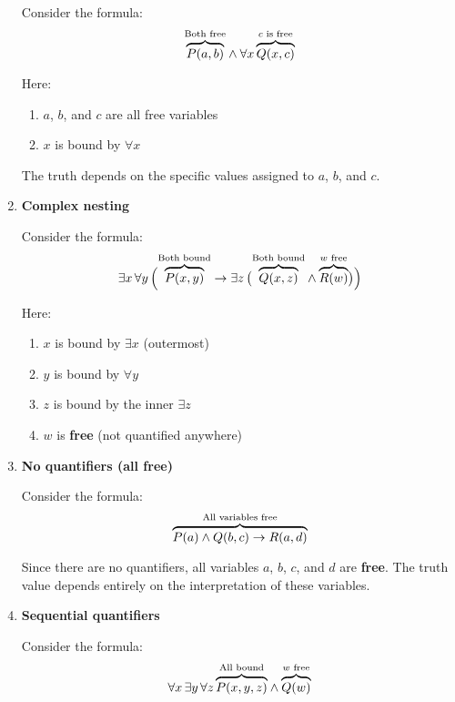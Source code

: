 \documentclass[12pt,a4paper,openany]{article}
\begin{document}
\begin{enumerate}
    Consider the formula:
    \[
    {\color{black}\overbrace{\color{black}P(a, b)}^{\color{black}\text{Both free}}} \wedge
    \forall x \,
    {\color{black}\overbrace{\color{black}Q(x, c)}^{\color{black}c \text{ is free}}}
    \]

    Here:
    \begin{enumerate}
        \item $a$, $b$, and $c$ are all free variables
        \item $x$ is bound by $\forall x$
    \end{enumerate}
    The truth depends on the specific values assigned to $a$, $b$, and $c$.
\item
    \textbf{Complex nesting}

    Consider the formula:
    \[
    \exists x \, \forall y \, \Big(
    {\color{black}\overbrace{\color{black}P(x, y)}^{\color{black}\text{Both bound}}} \rightarrow
    \exists z \,
    \big(
    {\color{black}\overbrace{\color{black}Q(x, z)}^{\color{black}\text{Both bound}}} \wedge
    {\color{black}\overbrace{\color{black}R(w)}^{\color{black}w \text{ free}}}
    \big)
    \Big)
    \]

    Here:
    \begin{enumerate}
        \item $x$ is bound by $\exists x$ (outermost)
        \item $y$ is bound by $\forall y$
        \item $z$ is bound by the inner $\exists z$
        \item $w$ is \textbf{free} (not quantified anywhere)
    \end{enumerate}
\item
    \textbf{No quantifiers (all free)}

    Consider the formula:
    \[
    {\color{black}\overbrace{\color{black}P(a) \wedge Q(b, c) \rightarrow R(a, d)}^{\color{black}\text{All variables free}}}
    \]

    Since there are no quantifiers, all variables $a$, $b$, $c$, and $d$ are \textbf{free}. The truth value depends entirely on the interpretation of these variables.
\item
    \textbf{Sequential quantifiers}

    Consider the formula:
    \[
    \forall x \, \exists y \, \forall z \,
    {\color{black}\overbrace{\color{black}P(x, y, z)}^{\color{black}\text{All bound}}} \wedge
    {\color{black}\overbrace{\color{black}Q(w)}^{\color{black}w \text{ free}}}
    \]


\end{enumerate}
\end{document}
